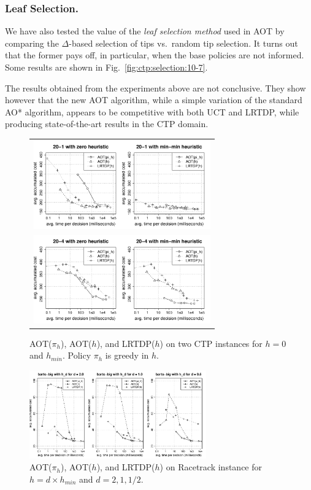 \documentclass[letterpaper]{article}
\begin{document}
\subsubsection{Leaf Selection.} We have also  tested the  value of  the \emph{leaf selection method} used in
AOT by comparing the $\Delta$-based selection of tips vs.\  random tip selection.
It turns out that the former pays off, in particular, when the base policies
are not informed. Some results are shown in Fig.~\ref{fig:ctp:selection:10-7}.

The results obtained from the experiments above are not conclusive. They show however
that the new AOT algorithm, while a simple variation of the standard AO* algorithm, appears
to be competitive with both UCT and LRTDP, while producing state-of-the-art results
in the  CTP domain.

\begin{figure}
\centering
\begin{tabular}{c}
\includegraphics[width=3in,clip=on,trim=.75cm 0cm 1.5cm 1cm]{ctp_aot_vs_lrtdp_20_1.pdf} \\
\includegraphics[width=3in,clip=on,trim=.75cm .7cm 1.5cm 1cm]{ctp_aot_vs_lrtdp_20_4.pdf}
\end{tabular}
\caption{AOT($\pi_h$), AOT($h$), and LRTDP($h$) on two CTP instances
  for $h=0$ and $h_{min}$. Policy $\pi_h$ is greedy in $h$.}
\label{fig:aot_vs_lrtdp:ctp}
\end{figure}




\begin{figure}
\centering
\includegraphics[width=3in,clip=on,trim=.75cm 1cm 1.5cm 1cm]{barto-big-aot-vs-lrtdp-minmin.pdf}
\caption{AOT($\pi_h$), AOT($h$), and LRTDP($h$) on
   Racetrack instance for $h=d \times h_{min}$ and $d=2,1,1/2$.}
\label{fig:aot_vs_lrtdp:racetrack}
\end{figure}
\end{document}
